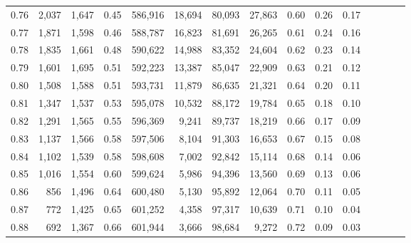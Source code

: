 \begin{tabular}{rrrcrrrrrrrrrrr}
0.76 &   2,037 &  1,647 &                                       0.45 &  586,916 &   18,694 &   80,093 &   27,863 &  0.60 &  0.26 &                         0.17 \\
0.77 &   1,871 &  1,598 &                                       0.46 &  588,787 &   16,823 &   81,691 &   26,265 &  0.61 &  0.24 &                         0.16 \\
0.78 &   1,835 &  1,661 &                                       0.48 &  590,622 &   14,988 &   83,352 &   24,604 &  0.62 &  0.23 &                         0.14 \\
0.79 &   1,601 &  1,695 &                                       0.51 &  592,223 &   13,387 &   85,047 &   22,909 &  0.63 &  0.21 &                         0.12 \\
0.80 &   1,508 &  1,588 &                                       0.51 &  593,731 &   11,879 &   86,635 &   21,321 &  0.64 &  0.20 &                         0.11 \\
0.81 &   1,347 &  1,537 &                                       0.53 &  595,078 &   10,532 &   88,172 &   19,784 &  0.65 &  0.18 &                         0.10 \\
0.82 &   1,291 &  1,565 &                                       0.55 &  596,369 &    9,241 &   89,737 &   18,219 &  0.66 &  0.17 &                         0.09 \\
0.83 &   1,137 &  1,566 &                                       0.58 &  597,506 &    8,104 &   91,303 &   16,653 &  0.67 &  0.15 &                         0.08 \\
0.84 &   1,102 &  1,539 &                                       0.58 &  598,608 &    7,002 &   92,842 &   15,114 &  0.68 &  0.14 &                         0.06 \\
0.85 &   1,016 &  1,554 &                                       0.60 &  599,624 &    5,986 &   94,396 &   13,560 &  0.69 &  0.13 &                         0.06 \\
0.86 &     856 &  1,496 &                                       0.64 &  600,480 &    5,130 &   95,892 &   12,064 &  0.70 &  0.11 &                         0.05 \\
0.87 &     772 &  1,425 &                                       0.65 &  601,252 &    4,358 &   97,317 &   10,639 &  0.71 &  0.10 &                         0.04 \\
0.88 &     692 &  1,367 &                                       0.66 &  601,944 &    3,666 &   98,684 &    9,272 &  0.72 &  0.09 &                         0.03 \\

\end{tabular}

